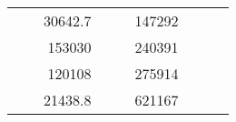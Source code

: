 \begin{table}[H]
\begin{tabular}{|ccrccrccc}
\multicolumn{1}{|c|}{\cellcolor[HTML]{FFFFC7}}                                & \multicolumn{1}{c|}{\cellcolor[HTML]{DDFDFF}}                      & \multicolumn{1}{r|}{\cellcolor[HTML]{DAE8FC}30642.7}   & \multicolumn{1}{c|}{\cellcolor[HTML]{FFFFC7}}                                & \multicolumn{1}{c|}{\cellcolor[HTML]{DDFDFF}}                       & \multicolumn{1}{r|}{\cellcolor[HTML]{DDFDFF}147292}    &                                                                              &                                                                    &                                                        \\ \cline{3-3} \cline{6-6}
\multicolumn{1}{|c|}{\cellcolor[HTML]{FFFFC7}}                                & \multicolumn{1}{c|}{\cellcolor[HTML]{DDFDFF}}                      & \multicolumn{1}{r|}{\cellcolor[HTML]{DDFDFF}153030}    & \multicolumn{1}{c|}{\cellcolor[HTML]{FFFFC7}}                                & \multicolumn{1}{c|}{\cellcolor[HTML]{DDFDFF}}                       & \multicolumn{1}{r|}{\cellcolor[HTML]{DAE8FC}240391}    &                                                                              &                                                                    &                                                        \\ \cline{3-3} \cline{6-6}
\multicolumn{1}{|c|}{\cellcolor[HTML]{FFFFC7}}                                & \multicolumn{1}{c|}{\cellcolor[HTML]{DDFDFF}}                      & \multicolumn{1}{r|}{\cellcolor[HTML]{DAE8FC}120108}    & \multicolumn{1}{c|}{\cellcolor[HTML]{FFFFC7}}                                & \multicolumn{1}{c|}{\cellcolor[HTML]{DDFDFF}}                       & \multicolumn{1}{r|}{\cellcolor[HTML]{DDFDFF}275914}    &                                                                              &                                                                    &                                                        \\ \cline{3-3} \cline{6-6}
\multicolumn{1}{|c|}{\cellcolor[HTML]{FFFFC7}}                                & \multicolumn{1}{c|}{\cellcolor[HTML]{DDFDFF}}                      & \multicolumn{1}{r|}{\cellcolor[HTML]{DDFDFF}21438.8}   & \multicolumn{1}{c|}{\cellcolor[HTML]{FFFFC7}}                                & \multicolumn{1}{c|}{\cellcolor[HTML]{DDFDFF}}                       & \multicolumn{1}{r|}{\cellcolor[HTML]{DAE8FC}621167}    &                                                                              &                                                                    &                                                        \\ \cline{3-3} \cline{6-6}

\end{tabular}
\end{table}

